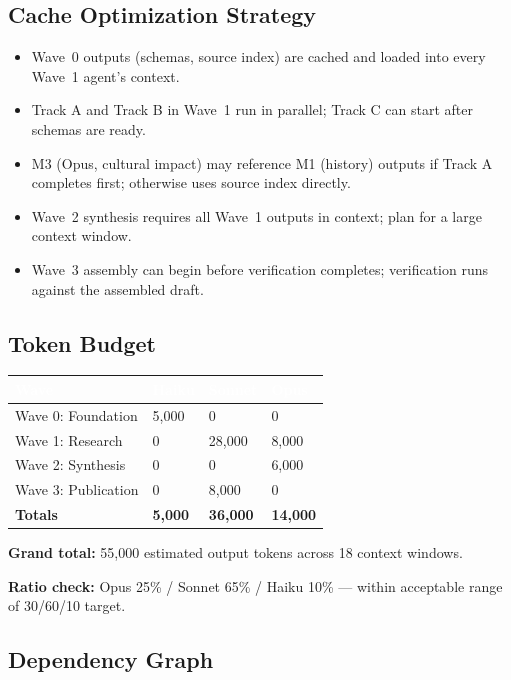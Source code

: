 \documentclass[11pt,letterpaper]{article}
\newcommand{\tableheader}[1]{\textbf{\sffamily\textcolor{white}{#1}}}
\begin{document}
\subsection{Cache Optimization Strategy}

\begin{itemize}[leftmargin=2em]
  \item Wave~0 outputs (schemas, source index) are cached and loaded into every Wave~1 agent's context.
  \item Track A and Track B in Wave~1 run in parallel; Track C can start after schemas are ready.
  \item M3 (Opus, cultural impact) may reference M1 (history) outputs if Track A completes first; otherwise uses source index directly.
  \item Wave~2 synthesis requires all Wave~1 outputs in context; plan for a large context window.
  \item Wave~3 assembly can begin before verification completes; verification runs against the assembled draft.
\end{itemize}

\subsection{Token Budget}

\begin{center}
\begin{tabularx}{\textwidth}{L{4cm}C{2cm}C{2cm}C{2cm}}
\toprule
{}
\tableheader{Wave} & \tableheader{Haiku} & \tableheader{Sonnet} & \tableheader{Opus} \\
\midrule
Wave 0: Foundation & 5,000 & 0 & 0 \\
Wave 1: Research & 0 & 28,000 & 8,000 \\
Wave 2: Synthesis & 0 & 0 & 6,000 \\
Wave 3: Publication & 0 & 8,000 & 0 \\
\midrule
\textbf{Totals} & \textbf{5,000} & \textbf{36,000} & \textbf{14,000} \\
\bottomrule
\end{tabularx}
\end{center}

\textbf{Grand total:} 55,000 estimated output tokens across 18 context windows.

\textbf{Ratio check:} Opus 25\% / Sonnet 65\% / Haiku 10\% --- within acceptable range of 30/60/10 target.

\subsection{Dependency Graph}
\end{document}
